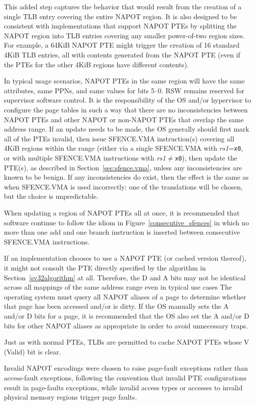 \begin{commentary}
  This added step captures the behavior that would result from the creation
  of a single TLB entry covering the entire NAPOT region.  It is also designed
  to be consistent with implementations that support NAPOT PTEs by splitting
  the NAPOT region into TLB entries covering any smaller power-of-two region
  sizes.  For example, a 64KiB NAPOT PTE might trigger the creation of 16
  standard 4KiB TLB entries, all with contents generated from the NAPOT PTE
  (even if the PTEs for the other 4KiB regions have different contents).

  In typical usage scenarios, NAPOT PTEs in the same region will have the same
  attributes, same PPNs, and same values for bits 5--0.  RSW remains reserved
  for supervisor software control.  It is the responsibility of the OS and/or
  hypervisor to configure the page tables in such a way that there are no
  inconsistencies between NAPOT PTEs and other NAPOT or non-NAPOT PTEs that
  overlap the same address range.  If an update needs to be made, the OS
  generally should first mark all of the PTEs invalid, then issue SFENCE.VMA
  instruction(s) covering all 4KiB regions within the range (either via a
  single SFENCE.VMA with {\em rs1}={\tt x0}, or with multiple SFENCE.VMA
  instructions with {\em rs1}$\neq${\tt x0}), then update the PTE(s), as
  described in Section~\ref{sec:sfence.vma}, unless any inconsistencies are
  known to be benign.  If any inconsistencies do exist, then the effect is the
  same as when SFENCE.VMA is used incorrectly: one of the translations will be
  chosen, but the choice is unpredictable.

  When updating a region of NAPOT PTEs all at once, it is recommended that
  software continue to follow the idiom in Figure~\ref{consecutive_sfences}
  in which no more than one add and one branch instruction is inserted between
  consecutive SFENCE.VMA instructions.

  If an implementation chooses to use a NAPOT PTE (or cached version thereof),
  it might not consult the PTE directly specified by the algorithm in
  Section~\ref{sv32algorithm} at all.  Therefore, the D and A bits may not be
  identical across all mappings of the same address range even in typical use
  cases  The operating system must query all NAPOT aliases of a page to
  determine whether that page has been accessed and/or is dirty.  If the OS
  manually sets the A and/or D bits for a page, it is recommended that the OS
  also set the A and/or D bits for other NAPOT aliases as appropriate in order
  to avoid unnecessary traps.

  Just as with normal PTEs, TLBs are permitted to cache NAPOT PTEs whose V
  (Valid) bit is clear.

  Invalid NAPOT encodings were chosen to raise page-fault exceptions rather
  than access-fault exceptions, following the convention that invalid PTE
  configurations result in page-faults exceptions, while invalid access
  types or accesses to invalid physical memory regions trigger page faults.
\end{commentary}

